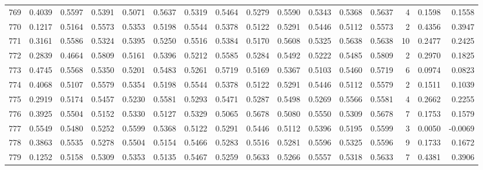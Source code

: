 \begin{tabular}{lrrrrrrrrrrrrrrr}
769 &      0.4039 &  0.5597 &  0.5391 &  0.5071 &  0.5637 &  0.5319 &  0.5464 &  0.5279 &  0.5590 &  0.5343 &   0.5368 &     0.5637 &      4 &                    0.1598 &                     0.1558 \\
770 &      0.1217 &  0.5164 &  0.5573 &  0.5353 &  0.5198 &  0.5544 &  0.5378 &  0.5122 &  0.5291 &  0.5446 &   0.5112 &     0.5573 &      2 &                    0.4356 &                     0.3947 \\
771 &      0.3161 &  0.5586 &  0.5324 &  0.5395 &  0.5250 &  0.5516 &  0.5384 &  0.5170 &  0.5608 &  0.5325 &   0.5638 &     0.5638 &     10 &                    0.2477 &                     0.2425 \\
772 &      0.2839 &  0.4664 &  0.5809 &  0.5161 &  0.5396 &  0.5212 &  0.5585 &  0.5284 &  0.5492 &  0.5222 &   0.5485 &     0.5809 &      2 &                    0.2970 &                     0.1825 \\
773 &      0.4745 &  0.5568 &  0.5350 &  0.5201 &  0.5483 &  0.5261 &  0.5719 &  0.5169 &  0.5367 &  0.5103 &   0.5460 &     0.5719 &      6 &                    0.0974 &                     0.0823 \\
774 &      0.4068 &  0.5107 &  0.5579 &  0.5354 &  0.5198 &  0.5544 &  0.5378 &  0.5122 &  0.5291 &  0.5446 &   0.5112 &     0.5579 &      2 &                    0.1511 &                     0.1039 \\
775 &      0.2919 &  0.5174 &  0.5457 &  0.5230 &  0.5581 &  0.5293 &  0.5471 &  0.5287 &  0.5498 &  0.5269 &   0.5566 &     0.5581 &      4 &                    0.2662 &                     0.2255 \\
776 &      0.3925 &  0.5504 &  0.5152 &  0.5330 &  0.5127 &  0.5329 &  0.5065 &  0.5678 &  0.5080 &  0.5550 &   0.5309 &     0.5678 &      7 &                    0.1753 &                     0.1579 \\
777 &      0.5549 &  0.5480 &  0.5252 &  0.5599 &  0.5368 &  0.5122 &  0.5291 &  0.5446 &  0.5112 &  0.5396 &   0.5195 &     0.5599 &      3 &                    0.0050 &                    -0.0069 \\
778 &      0.3863 &  0.5535 &  0.5278 &  0.5504 &  0.5154 &  0.5466 &  0.5283 &  0.5516 &  0.5281 &  0.5596 &   0.5325 &     0.5596 &      9 &                    0.1733 &                     0.1672 \\
779 &      0.1252 &  0.5158 &  0.5309 &  0.5353 &  0.5135 &  0.5467 &  0.5259 &  0.5633 &  0.5266 &  0.5557 &   0.5318 &     0.5633 &      7 &                    0.4381 &                     0.3906 \\

\end{tabular}

